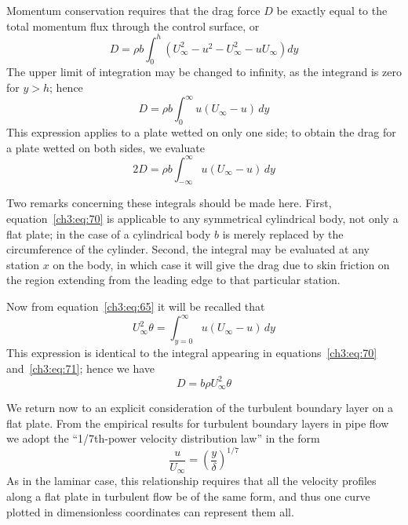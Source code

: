 Momentum conservation requires that the drag force $D$ be
exactly equal to the total momentum flux through the control
surface, or
\begin{equation}\label{ch3:eq:69}
D = \rho b\int_{0}^{h} \left(U_\infty^{2} - u^{2} - U_\infty^{2} - uU_\infty\right)dy
\end{equation}
The upper limit of integration may be changed to infinity, as
the integrand is zero for $y > h$; hence
\begin{equation}\label{ch3:eq:70}
D = \rho b\int_{0}^{\infty} u(U_\infty - u)\,dy
\end{equation}
This expression applies to a plate wetted on only one side; to
obtain the drag for a plate wetted on both sides, we evaluate
\begin{equation}\label{ch3:eq:71}
2D = \rho b\int_{-\infty}^{\infty} u(U_\infty - u)\,dy
\end{equation}

Two remarks concerning these integrals should be made here.
First, equation~\eqref{ch3:eq:70} is applicable to any symmetrical cylindrical
body, not only a flat plate; in the case of a cylindrical body
$b$ is merely replaced by the circumference of the cylinder.
Second, the integral may be evaluated at any station $x$ on the
body, in which case it will give the drag due to skin friction
on the region extending from the leading edge to that particular
station.

Now from equation~\eqref{ch3:eq:65} it will be recalled that
\begin{equation}\label{ch3:eq:72}
U_\infty^{2}\theta = \int_{y=0}^{\infty} u(U_\infty - u)\,dy
\end{equation}
This expression is identical to the integral appearing in
equations~\eqref{ch3:eq:70} and~\eqref{ch3:eq:71}; hence we have
\begin{equation}\label{ch3:eq:73}
D = b\rho U_\infty^{2}\theta
\end{equation}

We return now to an explicit consideration of the turbulent
boundary layer on a flat plate. From the empirical results for
turbulent boundary layers in pipe flow we adopt the ``1/7th-power
velocity distribution law'' in the form
\begin{equation}\label{ch3:eq:74}
\frac{u}{U_\infty} = \left(\frac{y}{\delta}\right)^{1/7}
\end{equation}
As in the laminar case, this relationship requires that all
the velocity profiles along a flat plate in turbulent flow
be of the same form, and thus one curve plotted in dimensionless
coordinates can represent them all.

